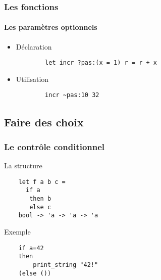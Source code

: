 \begin{frame}[fragile]
	\frametitle{Les fonctions}
	\framesubtitle{Les paramètres optionnels}
	\begin{itemize}	

	\item 	\begin{block}{Déclaration}
		\begin{lstlisting}
		let incr ?pas:(x = 1) r = r + x
		\end{lstlisting}
		\end{block}

	\item 	\begin{block}{Utilisation}
		\begin{lstlisting}
		incr ~pas:10 32
		\end{lstlisting}
		\end{block}

\end{itemize}
\end{frame}

\subsection{Faire des choix} %
\begin{frame}[fragile]
	\frametitle{Le contrôle conditionnel}
	\begin{block}{La structure}
	\begin{lstlisting}
	let f a b c = 
	  if a
	   then b 
	   else c
	bool -> 'a -> 'a -> 'a
	\end{lstlisting}
	\end{block}
	\begin{block}{Exemple}
	\begin{lstlisting}
	if a=42
  	then 
    	print_string "42!" 
  	(else ())
	\end{lstlisting}
	\end{block}
\end{frame}

